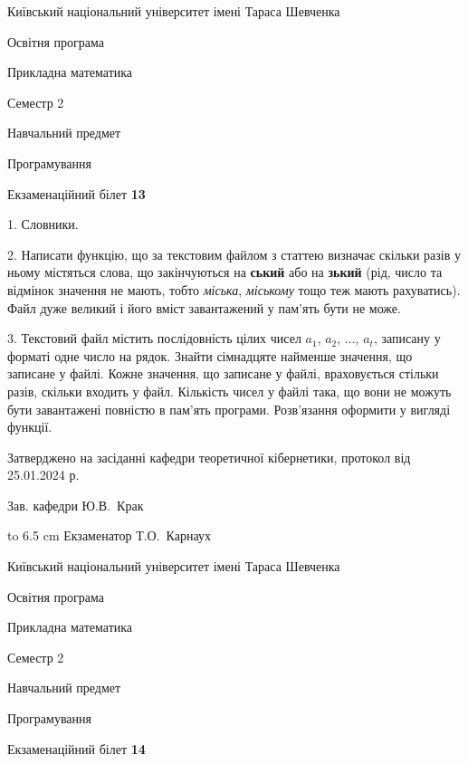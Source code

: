 \documentclass[12pt, ukrainian]{article}
\begin{document}
\newpage
{{\begin {scriptsize}\par
{ \center  Київський національний університет імені Тараса Шевченка \par}
{\parbox {5 cm}{Освітня програма \hfill}{\parbox {7 cm}{Прикладна математика\hfill}}\parbox {6 cm}{\hfill Семестр 2}}\par
{\parbox {5 cm} {Навчальний предмет \hfill}\parbox {7 cm}{Програмування \hfill}\parbox {6cm}{\hfill}\par}\vspace{-15pt} \end{scriptsize}}{\center Екзаменаційний білет \No \textbf { 13 }\par}}
{%
1. Словники.%
\par
2. Написати функцію, що за текстовим файлом з статтею визначає  скільки разів у ньому містяться слова, що закінчуються на \textbf{ський} або на \textbf{зький} (рід, число та відмінок значення не мають, тобто \textit{міська}, \textit{міському} тощо теж мають рахуватись). Файл дуже великий і його вміст завантажений у пам'ять бути не може.

\par
3. Текстовий файл містить послідовність цілих чисел $a_1$, $a_2$, $\ldots$, $a_t$, записану у форматі одне число на рядок. Знайти сімнадцяте найменше значення, що записане у файлі. Кожне значення, що записане у файлі, враховується стільки разів, скільки входить у файл. Кількість чисел у файлі така, що вони не можуть бути завантажені повністю в пам'ять програми. Розв'язання оформити у вигляді функції.

}
{\smallskip\smallskip \begin {scriptsize} Затверджено на засіданні кафедри теоретичної кібернетики, протокол   від   25.01.2024 р.\par\smallskip\smallskip\smallskip\smallskip
{\parbox {6.5 cm} {Зав. кафедри \dotfill Ю.В.~Крак}}\hspace {0.7cm} {\hbox to 6.5 cm { Екзаменатор \dotfill Т.О.~Карнаух}} \end{scriptsize}}
\vspace{0.9cm}
{{\begin {scriptsize}\par
{ \center  Київський національний університет імені Тараса Шевченка \par}
{\parbox {5 cm}{Освітня програма \hfill}{\parbox {7 cm}{Прикладна математика\hfill}}\parbox {6 cm}{\hfill Семестр 2}}\par
{\parbox {5 cm} {Навчальний предмет \hfill}\parbox {7 cm}{Програмування \hfill}\parbox {6cm}{\hfill}\par}\vspace{-15pt} \end{scriptsize}}{\center Екзаменаційний білет \No \textbf { 14 }\par}}
\end{document}
